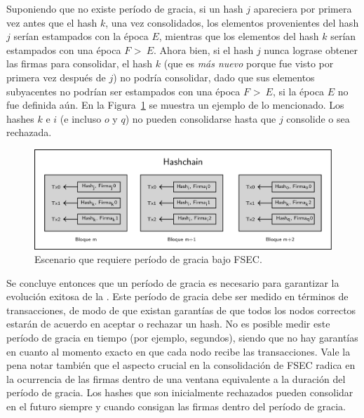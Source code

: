 Suponiendo que no existe período de gracia, si un hash $j$ apareciera por primera vez
antes que el hash $k$, una vez consolidados, los elementos provenientes del hash $j$
serían estampados con la época $E$, mientras que los elementos del hash $k$ serían estampados
con una época $F$ \textgreater \ $E$.
%
Ahora bien, 
%
si el hash $j$ nunca lograse obtener las \SPH firmas para
consolidar, el hash $k$ (que es \textit{más nuevo} porque fue visto por primera vez
después de $j$) no podría consolidar, dado que sus elementos subyacentes no podrían ser
estampados con una época $F$ \textgreater \ $E$, si la época $E$ no fue definida aún.
%
En la Figura~\ref{fig:grace_period} se muestra un ejemplo de lo mencionado. Los hashes
$k$ e $i$ (e incluso $o$ y $q$) no pueden consolidarse hasta que $j$ consolide o sea rechazada.

\begin{figure}
  \centering
  \includegraphics[scale=0.25]{figures/grace-period-example.png}
  \caption{Escenario que requiere período de gracia bajo FSEC.}
  \label{fig:grace_period}
\end{figure}

%
Se concluye entonces que un período de gracia es necesario para garantizar la evolución
exitosa de la \hashchain. 
%
Este período de gracia debe ser medido en términos de transacciones, de modo de que existan garantías
de que todos los nodos correctos estarán de acuerdo en aceptar o rechazar un hash.
%
No es posible medir este período de gracia en tiempo (por ejemplo, segundos), siendo que no hay garantías en
cuanto al momento exacto en que cada nodo recibe las transacciones.
%
Vale la pena notar también que el aspecto crucial en la consolidación de FSEC radica en la ocurrencia
de las \SPH firmas dentro de una ventana equivalente a la duración
del período de gracia.
%
Los hashes que son inicialmente rechazados pueden consolidar en el futuro siempre y cuando
consigan las \SPH firmas dentro del período de gracia.
%

